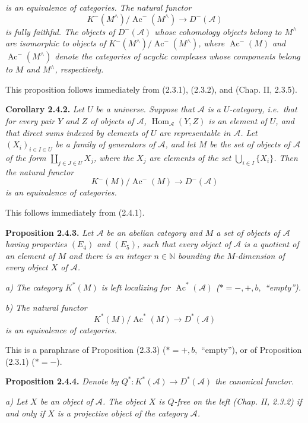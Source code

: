 \clearpage
{}%
\begingroup\small\setlength{\parskip}{0pt}\setlength{\emergencystretch}{1.5em}
\setlength{\abovedisplayskip}{4pt plus 2pt minus 2pt}%
\setlength{\belowdisplayskip}{4pt plus 2pt minus 2pt}%

\noindent\textit{is an equivalence of categories. The natural functor}
\[
K^{-}(M^{\wedge})/\operatorname{Ac}^{-}(M^{\wedge})
\longrightarrow D^{-}(\mathcal A)
\]
\noindent\textit{is fully faithful. The objects of $D^{-}(\mathcal A)$
whose cohomology objects belong to $M^{\wedge}$ are isomorphic to objects
of $K^{-}(M^{\wedge})/\operatorname{Ac}^{-}(M^{\wedge})$, where
$\operatorname{Ac}^{-}(M)$ and $\operatorname{Ac}^{-}(M^{\wedge})$
denote the categories of acyclic complexes whose components belong to $M$
and $M^{\wedge}$, respectively.}

This proposition follows immediately from (2.3.1), (2.3.2), and
(Chap. II, 2.3.5).

\medskip\noindent\textbf{Corollary 2.4.2.}\quad
\textit{Let $U$ be a universe. Suppose that $\mathcal A$ is a
$U$-category, i.e.\ that for every pair $Y$ and $Z$ of objects of $\mathcal A$,
$\operatorname{Hom}_{\mathcal A}(Y,Z)$ is an element of $U$, and that
direct sums indexed by elements of $U$ are representable in $\mathcal A$.
Let $(X_i)_{i\in I\in U}$ be a family of generators of $\mathcal A$, and
let $M$ be the set of objects of $\mathcal A$ of the form
$\coprod_{j\in J\in U}X_j$, where the $X_j$ are elements of the set
$\bigcup_{i\in I}\{X_i\}$. Then the natural functor}
\[
K^{-}(M)/\operatorname{Ac}^{-}(M)\longrightarrow D^{-}(\mathcal A)
\]
\noindent\textit{is an equivalence of categories.}

This follows immediately from (2.4.1).

\medskip\noindent\textbf{Proposition 2.4.3.}\quad
\textit{Let $\mathcal A$ be an abelian category and $M$ a set of objects
of $\mathcal A$ having properties $(E_4)$ and $(E_5)$, such that every
object of $\mathcal A$ is a quotient of an element of $M$ and there is an
integer $n\in\mathbb N$ bounding the $M$-dimension of every object $X$ of
$\mathcal A$.}

\noindent\textit{a) The category $K^{*}(M)$ is left localizing for
$\operatorname{Ac}^{*}(\mathcal A)$ ($*=-,+,b,{}$ ``empty'').}

\noindent\textit{b) The natural functor}
\[
K^{*}(M)/\operatorname{Ac}^{*}(M)\longrightarrow D^{*}(\mathcal A)
\]
\noindent\textit{is an equivalence of categories.}

This is a paraphrase of Proposition (2.3.3) ($*=+,b,{}$ ``empty''), or of
Proposition (2.3.1) ($*=-$).

\medskip\noindent\textbf{Proposition 2.4.4.}\quad
\textit{Denote by
$Q^{*}\colon K^{*}(\mathcal A)\longrightarrow D^{*}(\mathcal A)$ the
canonical functor.}

\noindent\textit{a) Let $X$ be an object of $\mathcal A$. The object $X$
is $Q$-free on the left (Chap. II, 2.3.2) if and only if $X$ is a
projective object of the category $\mathcal A$.}
\endgroup
